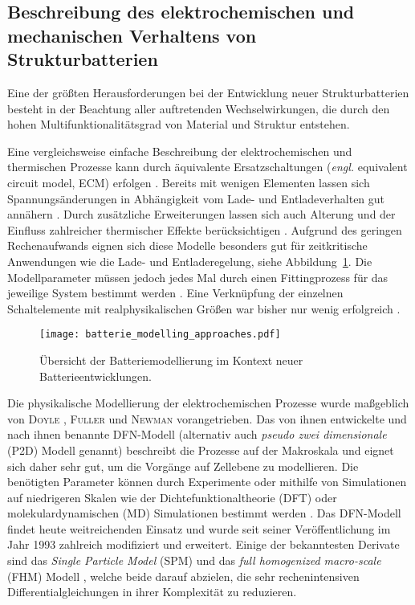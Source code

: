 \subsection{Beschreibung des elektrochemischen und mechanischen Verhaltens von Strukturbatterien}

Eine der größten Herausforderungen bei der Entwicklung neuer Strukturbatterien besteht in der Beachtung aller auftretenden Wechselwirkungen, die durch den hohen Multifunktionalitätsgrad von Material und Struktur entstehen.

Eine vergleichsweise einfache Beschreibung der elektrochemischen und thermischen Prozesse kann durch äquivalente Ersatzschaltungen (\textit{engl.} equivalent circuit model, ECM) erfolgen \cite{Bavsic2022}. Bereits mit wenigen Elementen lassen sich Spannungsänderungen in Abhängigkeit vom Lade- und Entladeverhalten gut annähern \cite{YannLiaw2004}. Durch zusätzliche Erweiterungen lassen sich auch Alterung und der Einfluss zahlreicher thermischer Effekte berücksichtigen \cite{Hannan2017,Tran2021}. Aufgrund des geringen Rechenaufwands eignen sich diese Modelle besonders gut für zeitkritische Anwendungen wie die Lade- und Entladeregelung, siehe Abbildung~\ref{fig:battery_modelling_in_context}. Die Modellparameter müssen jedoch jedes Mal durch einen Fittingprozess für das jeweilige System bestimmt werden \cite{Tomasov2019}. Eine Verknüpfung der einzelnen Schaltelemente mit realphysikalischen Größen war bisher nur wenig erfolgreich \cite{Plett2015}.
\begin{figure}[h]
        \center
	\texttt{[image: batterie\_modelling\_approaches.pdf]}
		\caption{\label{fig:battery_modelling_in_context}Übersicht der Batteriemodellierung im Kontext neuer Batterieentwicklungen.}
\end{figure}
Die physikalische Modellierung der elektrochemischen Prozesse wurde maßgeblich von \textsc{Doyle} \cite{Doyle1995,Doyle2003,Ceder2002}, \textsc{Fuller} \cite{Fuller2018,Takeuchi2008} und \textsc{Newman} \cite{Doyle1995,Newman2021} vorangetrieben. Das von ihnen entwickelte und nach ihnen benannte DFN-Modell (alternativ auch \textit{pseudo zwei dimensionale} (P2D) Modell genannt) \cite{Doyle1993} beschreibt die Prozesse auf der Makroskala und eignet sich daher sehr gut, um die Vorgänge auf Zellebene zu modellieren. Die benötigten Parameter können durch Experimente oder mithilfe von Simulationen auf niedrigeren Skalen wie der Dichtefunktionaltheorie (DFT) oder molekulardynamischen (MD) Simulationen bestimmt werden \cite{Chen2022}. Das DFN-Modell findet heute weitreichenden Einsatz und wurde seit seiner Veröffentlichung im Jahr 1993 zahlreich modifiziert und erweitert. Einige der bekanntesten Derivate sind das \textit{Single Particle Model} (SPM) \cite{Li2017} und das \textit{full homogenized macro-scale} (FHM) Modell \cite{Arunachalam2019}, welche beide darauf abzielen, die sehr rechenintensiven Differentialgleichungen in ihrer Komplexität zu reduzieren.

